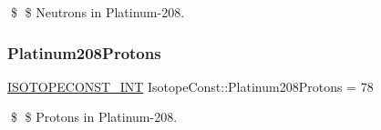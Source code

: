 \$ \$ Neutrons in Platinum-\/208. \mbox{\label{group___isotope_const-_platinum-_pt208_ga161d00f4721d2090ea5fb67cb6bfd931}} 
\subsubsection{\texorpdfstring{Platinum208\+Protons}{Platinum208Protons}}
{\footnotesize\ttfamily \mbox{\hyperlink{group___isotope_const-_macros_ga5f18360b3e99483a35c32d789e62621c}{I\+S\+O\+T\+O\+P\+E\+C\+O\+N\+S\+T\+\_\+\+I\+NT}} Isotope\+Const\+::\+Platinum208\+Protons = 78}

\$ \$ Protons in Platinum-\/208. 